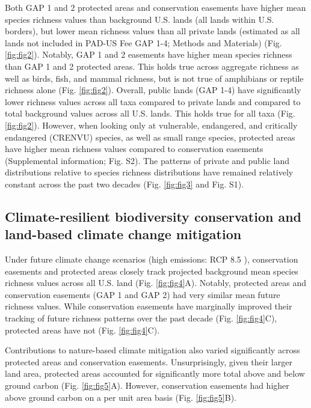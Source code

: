 \documentclass[3p]{elsarticle} %
\begin{document}
Both GAP 1 and 2 protected areas and conservation easements have higher
mean species richness values than background U.S. lands (all lands
within U.S. borders), but lower mean richness values than all private
lands (estimated as all lands not included in PAD-US Fee GAP 1-4;
Methods and Materials) (Fig. \ref{fig:fig2}). Notably, GAP 1 and 2
easements have higher mean species richness than GAP 1 and 2 protected
areas. This holds true across aggregate richness as well as birds, fish,
and mammal richness, but is not true of amphibians or reptile richness
alone (Fig. \ref{fig:fig2}). Overall, public lands (GAP 1-4) have
significantly lower richness values across all taxa compared to private
lands and compared to total background values across all U.S. lands.
This holds true for all taxa (Fig. \ref{fig:fig2}). However, when
looking only at vulnerable, endangered, and critically endangered
(CRENVU) species, as well as small range species, protected areas have
higher mean richness values compared to conservation easements
(Supplemental information; Fig. S2). The patterns of private and public
land distributions relative to species richness distributions have
remained relatively constant across the past two decades (Fig.
\ref{fig:fig3} and Fig. S1).

\hypertarget{climate-resilient-biodiversity-conservation-and-land-based-climate-change-mitigation}{%
\subsection{Climate-resilient biodiversity conservation and land-based
climate change
mitigation}\label{climate-resilient-biodiversity-conservation-and-land-based-climate-change-mitigation}}

Under future climate change scenarios (high emissions: RCP 8.5
\cite{Lawler2020b}), conservation easements and protected areas closely
track projected background mean species richness values across all U.S.
land (Fig. \ref{fig:fig4}A). Notably, protected areas and conservation
easements (GAP 1 and GAP 2) had very similar mean future richness
values. While conservation easements have marginally improved their
tracking of future richness patterns over the past decade (Fig.
\ref{fig:fig4}C), protected areas have not (Fig. \ref{fig:fig4}C).

Contributions to nature-based climate mitigation also varied
significantly across protected areas and conservation easements.
Unsurprisingly, given their larger land area, protected areas accounted
for significantly more total above and below ground carbon (Fig.
\ref{fig:fig5}A). However, conservation easements had higher above
ground carbon on a per unit area basis (Fig. \ref{fig:fig5}B).
\end{document}
